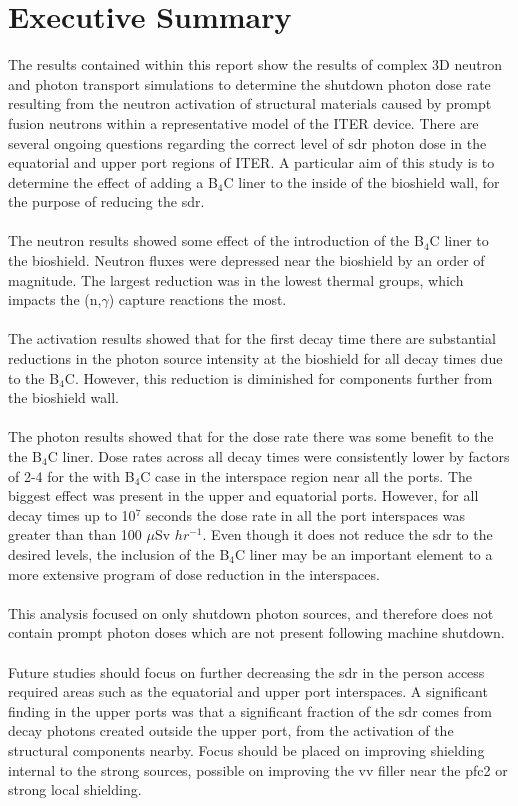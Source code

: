 \documentclass[12pt]{article}
\begin{document}
\glsresetall

\newpage
\section*{Executive Summary}

The results contained within this report show the results of complex 3D neutron
and photon transport simulations to determine the shutdown photon dose rate
resulting from the neutron activation of structural materials caused by prompt
fusion neutrons within a
representative model of the ITER device. There are several ongoing questions
regarding the correct level of \gls{sdr} photon dose in the equatorial and upper
port regions of ITER.  A particular aim of this study is to determine the effect
of adding a B$_4$C liner to the inside of the bioshield wall, for the purpose
of reducing the \gls{sdr}.
\\
\\
The neutron results showed some effect of the introduction of the B$_4$C liner 
to the bioshield.  Neutron fluxes were depressed near the bioshield by an 
order of magnitude. The largest reduction was in the lowest thermal groups, 
which impacts the (n,$\gamma$) capture reactions the most.
\\
\\
The activation results showed that for the first decay time there are 
substantial reductions in the photon source intensity at the bioshield for
all decay times due to the B$_4$C.  However, this reduction is diminished for 
components further from the bioshield wall.
\\
\\
The photon results showed that for the dose rate there was some benefit to the 
the B$_4$C liner. Dose rates across all decay times were consistently lower
by factors of 2-4 for the with B$_4$C case in the interspace region near all 
the ports. The biggest effect
was present in the upper and equatorial ports. However, for all decay times up to 
10$^7$ seconds the dose rate in all the port interspaces was greater than
than 100 $\mu$Sv $hr^{-1}$.  Even though it does not reduce the \gls{sdr} to the
desired levels, the inclusion of the B$_4$C liner may be an important element
to a more extensive program of dose reduction in the interspaces.
\\
\\
This analysis focused on only shutdown photon sources, and therefore does not
contain prompt photon doses which are not present following machine shutdown.
\\
\\
Future studies should focus on further decreasing the \gls{sdr} in the person 
access required areas such as the equatorial and upper port interspaces. A 
significant finding in the upper ports was that a significant fraction of the
\gls{sdr} comes from decay photons created outside the upper port, from the activation
of the structural components nearby. Focus should be placed on improving 
shielding internal to the strong sources, possible on improving the \gls{vv} filler
near the \gls{pfc}2 or strong local shielding. 
\end{document}
